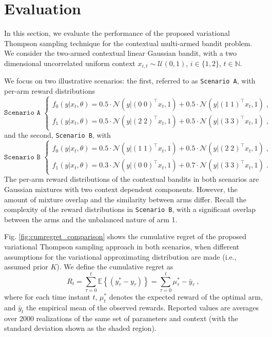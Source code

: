 \documentclass[10pt]{article}
\def \Natural{{\mathbb N}}
\newcommand{\eValue}[1]{\mathbb{E}\left\{ #1 \right\}}
\newcommand{\ie}{i.e., }
\newcommand{\N}{\mathcal{N}}
\newcommand{\U}{\mathcal{U}}
\begin{document}
\section{Evaluation}
\label{sec:evaluation}

In this section, we evaluate the performance of the proposed variational Thompson sampling technique for the contextual multi-armed bandit problem. We consider the two-armed contextual linear Gaussian bandit, with a two dimensional uncorrelated uniform context $x_{i,t}\sim\U(0,1)$, $i\in\{1,2\}$, $t\in \Natural$.

We focus on two illustrative scenarios: the first, referred to as \texttt{Scenario A}, with per-arm reward distributions
\begin{equation}
\texttt{Scenario A }\begin{cases}
f_{0}(y|x_t,\theta) = 0.5 \cdot \N\left(y|(0 \; 0)^\top x_t , 1\right) + 0.5 \cdot \N\left(y|(1 \; 1)^\top x_t , 1\right) \; ,\\
f_{1}(y|x_t,\theta) = 0.5 \cdot \N\left(y|(2 \; 2)^\top x_t , 1\right) + 0.5 \cdot \N\left(y|(3 \; 3)^\top x_t , 1\right) \; ,
\end{cases}
\label{eq:scenario_A}
\end{equation}
and the second, \texttt{Scenario B}, with
\begin{equation}
\texttt{Scenario B }\begin{cases}
f_{0}(y|x_t,\theta) = 0.5 \cdot \N\left(y|(1 \; 1)^\top x_t , 1\right) + 0.5 \cdot \N\left(y|(2 \; 2)^\top x_t , 1\right) \; ,\\
f_{1}(y|x_t,\theta) = 0.3 \cdot \N\left(y|(0 \; 0)^\top x_t , 1\right) + 0.7 \cdot \N\left(y|(3 \; 3)^\top x_t , 1\right) \; .
\end{cases}
\label{eq:scenario_B}
\end{equation}
The per-arm reward distributions of the contextual bandits in both scenarios are Gaussian mixtures with two context dependent components. However, the amount of mixture overlap and the similarity between arms differ. Recall the complexity of the reward distributions in \texttt{Scenario B}, with a significant overlap between the arms and the unbalanced nature of arm 1.

Fig. \ref{fig:cumregret_comparison} shows the cumulative regret of the proposed variational Thompson sampling approach in both scenarios, when different assumptions for the variational approximating distribution are made (\ie assumed prior $K$). We define the cumulative regret as
\begin{equation}
R_t=\sum_{\tau=0}^t \eValue{\left(y^*_{\tau}-y_{\tau} \right)} = \sum_{\tau=0}^t \mu_\tau^*-\bar{y}_{\tau} \; ,
\end{equation}
where for each time instant $t$, $\mu_t^*$ denotes the expected reward of the optimal arm, and $\bar{y}_{t}$ the empirical mean of the observed rewards. Reported values are averages over 2000 realizations of the same set of parameters and context (with the standard deviation shown as the shaded region).
\end{document}
